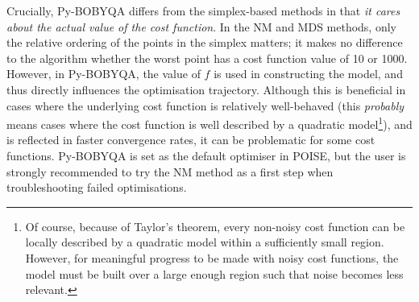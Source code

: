 Crucially, Py-BOBYQA differs from the simplex-based methods in that \textit{it cares about the actual value of the cost function}.
In the NM and MDS methods, only the relative ordering of the points in the simplex matters; it makes no difference to the algorithm whether the worst point has a cost function value of 10 or 1000.
However, in Py-BOBYQA, the value of $f$ is used in constructing the model, and thus directly influences the optimisation trajectory.
Although this is beneficial in cases where the underlying cost function is relatively well-behaved (this \textit{probably} means cases where the cost function is well described by a quadratic model\footnote{Of course, because of Taylor's theorem, every non-noisy cost function can be locally described by a quadratic model within a sufficiently small region. However, for meaningful progress to be made with noisy cost functions, the model must be built over a large enough region such that noise becomes less relevant.}), and is reflected in faster convergence rates, it can be problematic for some cost functions.
Py-BOBYQA is set as the default optimiser in POISE, but the user is strongly recommended to try the NM method as a first step when troubleshooting failed optimisations.
